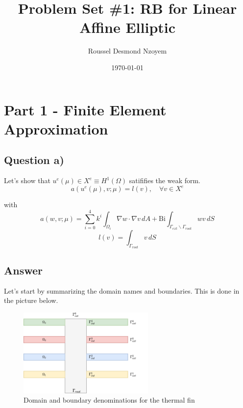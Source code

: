 \documentclass[
	english,
	11pt, %
]{fphw}
\title{Problem Set \#1: RB for Linear Affine Elliptic} %
\author{Roussel Desmond Nzoyem} %
\date{\today} %
\institute{University of Strasbourg \\ UFR de Mathématiques et Informatique} %
\newcommand{\bi}{\text{Bi}}
\begin{document}
\maketitle %



\section{Part 1 - Finite Element Approximation}

\subsection*{Question a)}
\begin{problem}
	Let's show that $u^e(\mu) \in X^e \equiv H^1(\Omega)$ satififies the weak form.
	\begin{equation}
		\tag{7}\label{eq:7}
		a(u^e(\mu),v;\mu)=l(v), \quad \forall v \in X^e 
	\end{equation}

	with
	$$
		a(w,v;\mu) = \sum_{i=0}^{4} k^i \int_{\Omega_i} \nabla w \cdot \nabla v \, dA + \bi \int_{\Gamma_{ext} \backslash \Gamma_{root}} w v \, dS
	$$
	$$
		l(v) = \int_{\Gamma_{root}} v \, dS
	$$
\end{problem}


\subsection*{Answer} 


\indent Let's start by summarizing the domain names and boundaries. This is done in the picture below.

\begin{figure}[h]
	\centering
	\includegraphics[width=0.6\textwidth]{ThermalFin.png}
	\captionsetup{justification=centering}
	\caption{Domain and boundary denominations for the thermal fin}
\end{figure}
\end{document}
